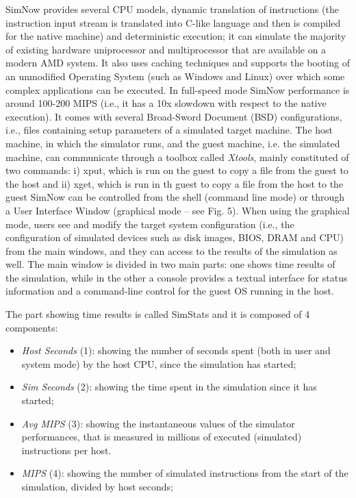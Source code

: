 \documentclass[a4paper]{article}
\begin{document}
{
SimNow provides several CPU models, dynamic translation of instructions
(the instruction input stream is translated into C-like language and
then is compiled for the native machine) and deterministic execution;
it can simulate the majority of existing hardware uniprocessor and
multiprocessor that are available on a modern AMD system. It also uses
caching techniques and supports the booting of an unmodified Operating
System (such as Windows and Linux) over which some complex applications
can be executed. In full-speed mode SimNow performance is around
100-200 MIPS (i.e., it has a 10x slowdown with respect to the native
execution). It comes with several Broad-Sword Document (BSD)
configurations, i.e., files containing setup parameters of a simulated
target machine. The host machine, in which the simulator runs, and the
guest machine, i.e. the simulated machine, can communicate through a
toolbox called \textit{Xtools}, mainly constituted of two commands: i)
xput, which is run on the guest to copy a file from the guest to the
host and ii) xget, which is run in th guest to copy a file from the
host to the guest SimNow can be controlled from the shell (command line
mode) or through a User Interface Window (graphical mode -- see Fig.
5). When using the graphical mode, users see and modify the target
system configuration (i.e., the configuration of simulated devices such
as disk images, BIOS, DRAM and CPU) from the main windows, and they can
access to the results of the simulation as well. The main window is
divided in two main parts: one shows time results of the simulation,
while in the other a console provides a textual interface for status
information and a command-line control for the guest OS running in the
host.}

{
The part showing time results is called SimStats and it is composed of 4
components:}

\begin{itemize}
\item {
\textit{Host Seconds} (1): showing the number of seconds spent (both in
user and system mode) by the host CPU, since the simulation has
started;}
\item {
\textit{Sim Seconds} (2): showing the time spent in the simulation since
it has started;}
\item {
\textit{Avg MIPS} (3): showing the instantaneous values of the simulator
performances, that is measured in millions of executed (simulated)
instructions per host.}
\end{itemize}
\begin{itemize}
\item {
\textit{MIPS} (4): showing the number of simulated instructions from the
start of the simulation, divided by host seconds;}
\end{itemize}
\end{document}
